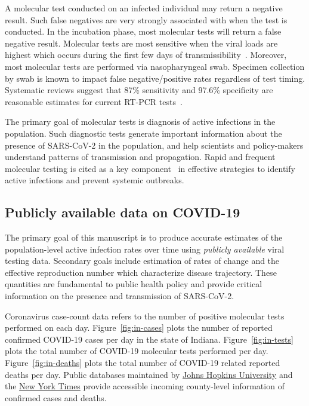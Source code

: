 \documentclass[11pt]{amsart}
\numberwithin{equation}{section}
\theoremstyle{plain}
\begin{document}
A molecular test conducted on an infected individual may return a negative result.  Such false negatives are very strongly associated with when the test is conducted.  In the incubation phase, most molecular tests will return a false negative result.  Molecular tests are most sensitive when the viral loads are highest which occurs during the first few days of transmissibility~\citep{Mina2020}.   Moreover, most molecular tests are performed via nasopharyngeal swab.  Specimen collection by swab is known to impact false negative/positive rates regardless of test timing.   Systematic reviews suggest that 87\% sensitivity and 97.6\% specificity are reasonable estimates for current RT-PCR tests~\cite{Arevalo2020, Woloshin2020,Cohen2020}.

The primary goal of molecular tests is diagnosis of active infections in the population.  Such diagnostic tests generate important information about the presence of SARS-CoV-2 in the population, and help scientists and policy-makers understand patterns of transmission and propagation. Rapid and frequent molecular testing is cited as a key component~\cite{OECD2021} in effective strategies to identify active infections and prevent systemic outbreaks.

\subsection{Publicly available data on COVID-19}
\label{subsection:testinginfo}

The primary goal of this manuscript is to produce accurate estimates of the population-level active infection rates over time using \emph{publicly available} viral testing data.  Secondary goals include estimation of rates of change and the effective reproduction number which characterize disease trajectory.
These quantities are fundamental to public health policy and provide critical information on the presence and transmission of SARS-CoV-2.



Coronavirus case-count data refers to the number of positive molecular tests performed on each day.  Figure~\ref{fig:in-cases} plots the number of reported confirmed COVID-19 cases per day in the state of Indiana.  Figure~\ref{fig:in-tests} plots the total number of COVID-19 molecular tests performed per day. Figure~\ref{fig:in-deaths} plots the total number of COVID-19 related reported deaths per day. Public databases maintained by \href{https://bit.ly/2UqFSuA}{Johns Hopkins University} and the \href{https://bit.ly/2vUHfrK}{New York Times} provide accessible incoming county-level information of confirmed cases and deaths.
\end{document}
